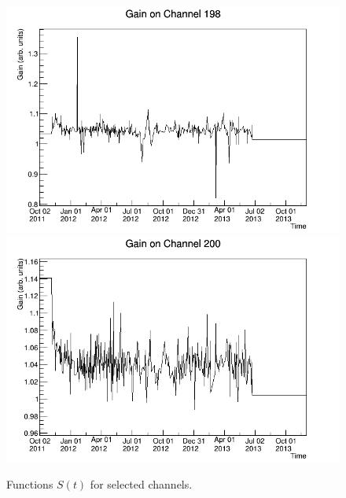\begin{figure}
\begin{center}
\includegraphics[keepaspectratio=true,width=\textwidth]{gainfunc_198.png}
\includegraphics[keepaspectratio=true,width=\textwidth]{gainfunc_200.png}
\end{center}
\renewcommand{\baselinestretch}{1}
\small\normalsize
\begin{quote}
\caption{Functions $S(t)$ for selected channels.}
\label{fig:LightmapGainFunc2}
\end{quote}
\end{figure}
\renewcommand{\baselinestretch}{2}
\small\normalsize

